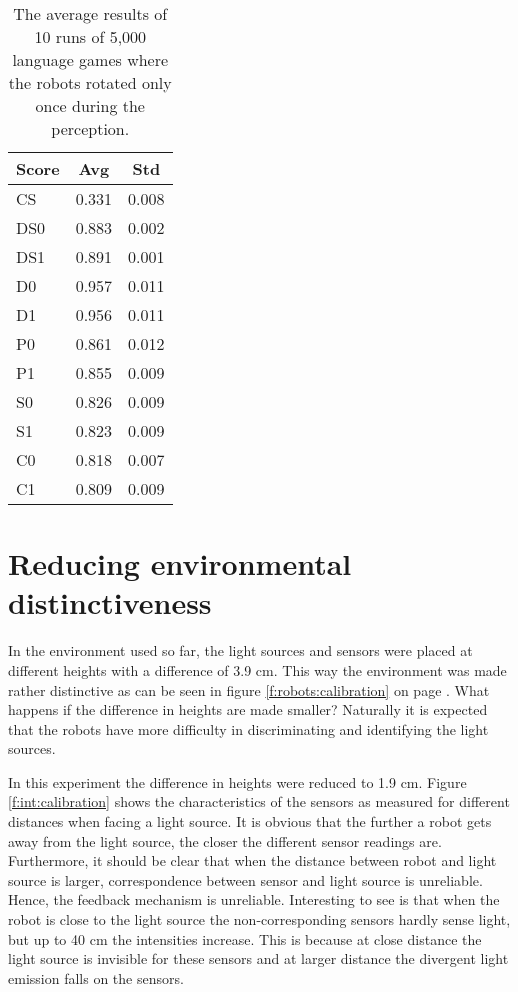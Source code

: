\begin{table}
\centering
\begin{tabular}{||l|c|c||}
\hline\hline
Score & Avg & Std\\\hline
CS & 0.331 & 0.008\\\hline
DS0 & 0.883 & 0.002\\\hline
DS1 & 0.891 & 0.001\\\hline
D0 & 0.957 & 0.011\\\hline
D1 & 0.956 & 0.011\\\hline
P0 & 0.861 & 0.012\\\hline
P1 & 0.855 & 0.009\\\hline
S0 & 0.826 & 0.009\\\hline
S1 & 0.823 & 0.009\\\hline
C0 & 0.818 & 0.007\\\hline
C1 & 0.809 & 0.009\\\hline
\hline
\end{tabular}
\caption{The average results of 10 runs of 5,000 language games where the robots rotated only once during the perception.}
\label{t:int:original}
\end{table}

\section{Reducing environmental distinctiveness}\label{s:int:close}

In the environment used so far, the light sources and sensors were placed at different heights with a difference of 3.9 cm. This way the environment was made rather distinctive as can be seen in figure \ref{f:robots:calibration} on page \pageref{f:robots:calibration}. What happens if the difference in heights are made smaller? Naturally it is expected that the robots have more difficulty in discriminating and identifying the light sources.

In this experiment the difference in heights were reduced to 1.9 cm. Figure \ref{f:int:calibration} shows the characteristics of the sensors as measured for different distances when facing a light source. It is obvious that the further a robot gets away from the light source, the closer the different sensor readings are. Furthermore, it should be clear that when the distance between robot and light source is larger, correspondence between sensor and light source is unreliable. Hence, the feedback mechanism is unreliable. Interesting to see is that when the robot is close to the light source the non-corresponding sensors hardly sense light, but up to 40 cm the intensities increase. This is because at close distance the light source is invisible for these sensors and at larger distance the divergent light emission falls on the sensors.

